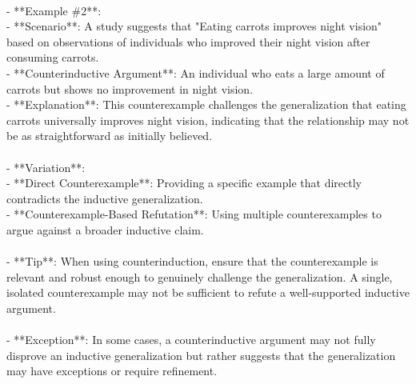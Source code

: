 \documentclass[a4paper,12pt,single,pdftex]{scrartcl}
\begin{document}
    \\

    
      - **Example \#2**:
    \\

    
        - **Scenario**: A study suggests that "Eating carrots improves night vision" based on observations of individuals who improved their night vision after consuming carrots.
    \\

    
        - **Counterinductive Argument**: An individual who eats a large amount of carrots but shows no improvement in night vision.
    \\

    
        - **Explanation**: This counterexample challenges the generalization that eating carrots universally improves night vision, indicating that the relationship may not be as straightforward as initially believed.
    \\

    
      
    \\

    
      - **Variation**:
    \\

    
        - **Direct Counterexample**: Providing a specific example that directly contradicts the inductive generalization.
    \\

    
        - **Counterexample-Based Refutation**: Using multiple counterexamples to argue against a broader inductive claim.
    \\

    
      
    \\

    
      - **Tip**: When using counterinduction, ensure that the counterexample is relevant and robust enough to genuinely challenge the generalization. A single, isolated counterexample may not be sufficient to refute a well-supported inductive argument.
    \\

    
      
    \\

    
      - **Exception**: In some cases, a counterinductive argument may not fully disprove an inductive generalization but rather suggests that the generalization may have exceptions or require refinement.
    \\
\end{document}

